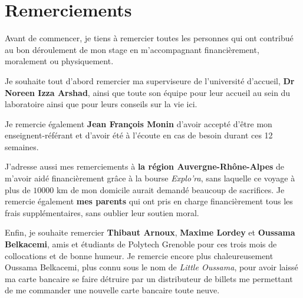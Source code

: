 \chapter*{Remerciements}

Avant de commencer, je tiens à remercier toutes les personnes qui ont contribué au bon déroulement de mon stage en m'accompagnant financièrement, moralement ou physiquement.

Je souhaite tout d'abord remercier ma superviseure de l'université d'accueil, \textbf{Dr Noreen Izza Arshad}, ainsi que toute son équipe pour leur accueil au sein du laboratoire ainsi que pour leurs conseils sur la vie ici.

Je remercie également \textbf{Jean François Monin} d'avoir accepté d'être mon enseignent-référant et d'avoir été à l'écoute en cas de besoin durant ces 12 semaines.

J'adresse aussi mes remerciements à \textbf{la région Auvergne-Rhône-Alpes} de m'avoir aidé financièrement grâce à la bourse \textit{Explo'ra}, sans laquelle ce voyage à plus de $10000$ km de mon domicile aurait demandé beaucoup de sacrifices. Je remercie également \textbf{mes parents} qui ont pris en charge financièrement tous les frais supplémentaires, sans oublier leur soutien moral.

Enfin, je souhaite remercier \textbf{Thibaut Arnoux}, \textbf{Maxime Lordey} et \textbf{Oussama Belkacemi}, amis et étudiants de Polytech Grenoble pour ces trois mois de collocations et de bonne humeur. Je remercie encore plus chaleureusement Oussama Belkacemi, plus connu sous le nom de \textit{Little Oussama}, pour avoir laissé ma carte bancaire se faire détruire par un distributeur de billets me permettant de me commander une nouvelle carte bancaire toute neuve.
